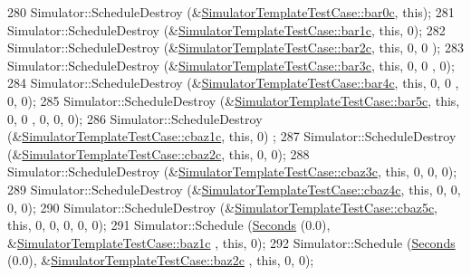 \begin{DoxyCode}
280   Simulator::ScheduleDestroy (&\hyperlink{classSimulatorTemplateTestCase_a39381dd6c298ce90120f9ca020b51a44}{SimulatorTemplateTestCase::bar0c}, \textcolor{keyword}{this});
281   Simulator::ScheduleDestroy (&\hyperlink{classSimulatorTemplateTestCase_a17a705290d33ff9d9752c5fcd3ca549a}{SimulatorTemplateTestCase::bar1c}, \textcolor{keyword}{this}, 0);
282   Simulator::ScheduleDestroy (&\hyperlink{classSimulatorTemplateTestCase_a95e0f184170b9dd6ced11d3423752e9f}{SimulatorTemplateTestCase::bar2c}, \textcolor{keyword}{this}, 0, 0
      );
283   Simulator::ScheduleDestroy (&\hyperlink{classSimulatorTemplateTestCase_a3440409096aee7c6dda41caab7cceeb6}{SimulatorTemplateTestCase::bar3c}, \textcolor{keyword}{this}, 0, 0
      , 0);
284   Simulator::ScheduleDestroy (&\hyperlink{classSimulatorTemplateTestCase_a4d7fde0e0f8f16201cb8731a65c84188}{SimulatorTemplateTestCase::bar4c}, \textcolor{keyword}{this}, 0, 0
      , 0, 0);
285   Simulator::ScheduleDestroy (&\hyperlink{classSimulatorTemplateTestCase_af3908d1e88e554a76b7fcb7c6011182a}{SimulatorTemplateTestCase::bar5c}, \textcolor{keyword}{this}, 0, 0
      , 0, 0, 0);
286   Simulator::ScheduleDestroy (&\hyperlink{classSimulatorTemplateTestCase_abfb9fdb2a45df1b572e31d911da70af1}{SimulatorTemplateTestCase::cbaz1c}, \textcolor{keyword}{this}, 0)
      ;
287   Simulator::ScheduleDestroy (&\hyperlink{classSimulatorTemplateTestCase_aceaaaedcf5defc916793b2b5d0908cae}{SimulatorTemplateTestCase::cbaz2c}, \textcolor{keyword}{this}, 0,
       0);
288   Simulator::ScheduleDestroy (&\hyperlink{classSimulatorTemplateTestCase_a231add1c9938940ecfde69823e44dfc4}{SimulatorTemplateTestCase::cbaz3c}, \textcolor{keyword}{this}, 0,
       0, 0);
289   Simulator::ScheduleDestroy (&\hyperlink{classSimulatorTemplateTestCase_a7ce3f71d66de538a7cd7c33faa0c4c17}{SimulatorTemplateTestCase::cbaz4c}, \textcolor{keyword}{this}, 0,
       0, 0, 0);
290   Simulator::ScheduleDestroy (&\hyperlink{classSimulatorTemplateTestCase_a2472cd2565c2643449dfe42756a0e58f}{SimulatorTemplateTestCase::cbaz5c}, \textcolor{keyword}{this}, 0,
       0, 0, 0, 0);
291   Simulator::Schedule (\hyperlink{group__timecivil_ga33c34b816f8ff6628e33d5c8e9713b9e}{Seconds} (0.0), &\hyperlink{classSimulatorTemplateTestCase_af05903f120083bb45844f0a27234441f}{SimulatorTemplateTestCase::baz1c}
      , \textcolor{keyword}{this}, 0);
292   Simulator::Schedule (\hyperlink{group__timecivil_ga33c34b816f8ff6628e33d5c8e9713b9e}{Seconds} (0.0), &\hyperlink{classSimulatorTemplateTestCase_a6bec79b87dd5ccbd94c5e3af6b2462ea}{SimulatorTemplateTestCase::baz2c}
      , \textcolor{keyword}{this}, 0, 0);

\end{DoxyCode}
